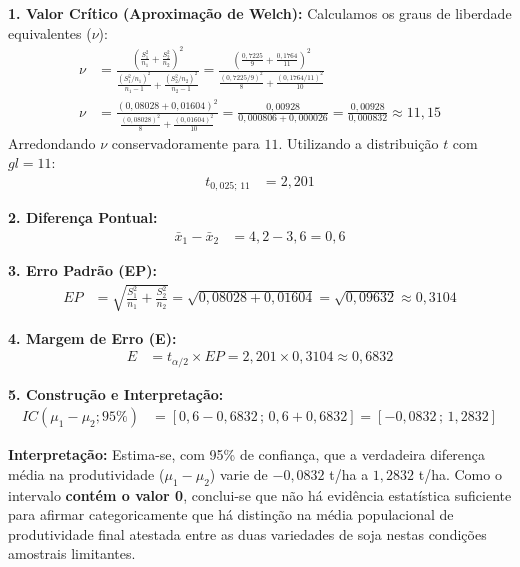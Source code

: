 \documentclass[12pt, a4paper]{article}
\begin{document}
\noindent \textbf{1. Valor Crítico (Aproximação de Welch):}
Calculamos os graus de liberdade equivalentes ($\nu$):
\begin{align*}
\nu &= \frac{\left(\frac{S_1^2}{n_1} + \frac{S_2^2}{n_2}\right)^2}{\frac{(S_1^2/n_1)^2}{n_1-1} + \frac{(S_2^2/n_2)^2}{n_2-1}} = \frac{\left(\frac{0{,}7225}{9} + \frac{0{,}1764}{11}\right)^2}{\frac{(0{,}7225/9)^2}{8} + \frac{(0{,}1764/11)^2}{10}} \\
\nu &= \frac{(0{,}08028 + 0{,}01604)^2}{\frac{(0{,}08028)^2}{8} + \frac{(0{,}01604)^2}{10}} = \frac{0{,}00928}{0{,}000806 + 0{,}000026} = \frac{0{,}00928}{0{,}000832} \approx 11{,}15
\end{align*}
Arredondando $\nu$ conservadoramente para $11$. Utilizando a distribuição $t$ com $gl=11$:
\begin{align*}
t_{0{,}025; \, 11} &= \boxed{2{,}201}
\end{align*}

\noindent \textbf{2. Diferença Pontual:}
\begin{align*}
\bar{x}_1 - \bar{x}_2 &= 4{,}2 - 3{,}6 = \boxed{0{,}6}
\end{align*}

\noindent \textbf{3. Erro Padrão (EP):}
\begin{align*}
EP &= \sqrt{\frac{S_1^2}{n_1} + \frac{S_2^2}{n_2}} = \sqrt{0{,}08028 + 0{,}01604} = \sqrt{0{,}09632} \approx \boxed{0{,}3104}
\end{align*}

\noindent \textbf{4. Margem de Erro (E):}
\begin{align*}
E &= t_{\alpha/2} \times EP = 2{,}201 \times 0{,}3104 \approx \boxed{0{,}6832}
\end{align*}

\noindent \textbf{5. Construção e Interpretação:}
\begin{align*}
IC(\mu_1 - \mu_2; 95\%) &= [0{,}6 - 0{,}6832 \,;\, 0{,}6 + 0{,}6832] = \boxed{[-0{,}0832 \,;\, 1{,}2832]}
\end{align*}

\noindent \textbf{Interpretação:} Estima-se, com 95\% de confiança, que a verdadeira diferença média na produtividade ($\mu_1 - \mu_2$) varie de $-0{,}0832$ t/ha a $1{,}2832$ t/ha. Como o intervalo \textbf{contém o valor 0}, conclui-se que não há evidência estatística suficiente para afirmar categoricamente que há distinção na média populacional de produtividade final atestada entre as duas variedades de soja nestas condições amostrais limitantes.
\end{document}

